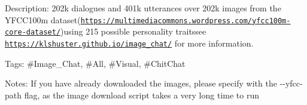 Description\+: 202k dialogues and 401k utterances over 202k images from the Y\+F\+C\+C100m dataset(\href{https://multimediacommons.wordpress.com/yfcc100m-core-dataset/}{\tt https\+://multimediacommons.\+wordpress.\+com/yfcc100m-\/core-\/dataset/})using 215 possible personality traitssee \href{https://klshuster.github.io/image_chat/}{\tt https\+://klshuster.\+github.\+io/image\+\_\+chat/} for more information.

Tags\+: \#\+Image\+\_\+\+Chat, \#\+All, \#\+Visual, \#\+Chit\+Chat

Notes\+: If you have already downloaded the images, please specify with the {\ttfamily -\/-\/yfcc-\/path} flag, as the image download script takes a very long time to run 